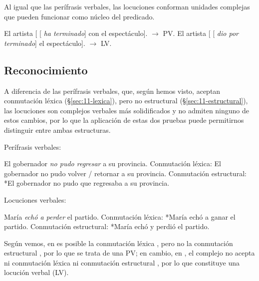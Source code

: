 Al igual que las perífrasis verbales, las locuciones conforman unidades
complejas que pueden funcionar como núcleo del predicado.

\begin{exe}
  \ex
    \begin{xlist}
      \ex El artista [ [ \textit{ha terminado}] con el
          espectáculo]. $\rightarrow$ PV.
      \ex El artista [ [ \textit{dio por terminado}] el
          espectáculo]. $\rightarrow$ LV.
    \end{xlist}
\end{exe}

\subsection{Reconocimiento}\label{sec:11-reconocimiento-lv}

A diferencia de las perífrasis verbales, que, según hemos visto, aceptan
conmutación léxica (§\ref{sec:11-lexica}), pero no estructural
(§\ref{sec:11-estructural}), las locuciones son complejos verbales más
solidificados y no admiten ninguno de estos cambios, por lo que la aplicación de
estas dos pruebas puede permitirnos distinguir entre ambas estructuras.

\begin{exe}
  \ex\label{ex:11-gobernador} Perífrasis verbales:
    \begin{xlist}
      \ex El gobernador \textit{no pudo regresar} a su provincia.
      \ex\label{ex:11-gobernador-b} Conmutación léxica: El gobernador no pudo
          volver / retornar a su provincia.
      \ex\label{ex:11-gobernador-c} Conmutación estructural: *El gobernador no
          pudo que regresaba a su provincia.
    \end{xlist}
  \ex\label{ex:11-partido} Locuciones verbales:
    \begin{xlist}
      \ex María \textit{echó a perder} el partido.
      \ex\label{ex:11-partido-b} Conmutación léxica: *María echó a ganar el
          partido.
      \ex\label{ex:11-partido-c} Conmutación estructural: *María echó y perdió el
          partido.
    \end{xlist}
\end{exe}

Según vemos, en  es posible la conmutación léxica
, pero no la conmutación estructural
, por lo que se trata de una PV; en cambio, en
, el complejo  no acepta ni conmutación
léxica  ni conmutación estructural
, por lo que constituye una locución verbal (LV).

